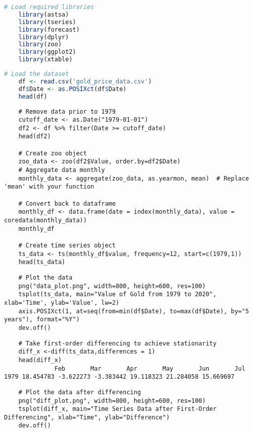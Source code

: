 \begin{lstlisting}[language=R]
    # Load required libraries
    library(astsa)
    library(tseries)
    library(forecast)
    library(dplyr)
    library(zoo)
    library(ggplot2)
    library(xtable)
\end{lstlisting}

\begin{lstlisting}[language=R]
    # Load the dataset
    df <- read.csv('gold_price_data.csv')
    df$Date <- as.POSIXct(df$Date)
    head(df)
\end{lstlisting}

\begin{lstlisting}
    # Remove data prior to 1979 
    cutoff_date <- as.Date("1979-01-01")
    df2 <- df %>% filter(Date >= cutoff_date)
    head(df2)
    
    # Create zoo object
    zoo_data <- zoo(df2$Value, order.by=df2$Date)
    # Aggregate data monthly
    monthly_data <- aggregate(zoo_data, as.yearmon, mean)  # Replace 'mean' with your function
    
    # Convert back to dataframe
    monthly_df <- data.frame(date = index(monthly_data), value = coredata(monthly_data))
    monthly_df

    # Create time series object
    ts_data <- ts(monthly_df$value, frequency=12, start=c(1979,1))
    head(ts_data)
\end{lstlisting}

\begin{lstlisting}
    # Plot the data
    png("data_plot.png", width=800, height=600, res=100)
    tsplot(ts_data, main="Value of Gold from 1979 to 2020", xlab='Time', ylab='Value', lw=2)
    axis.POSIXct(1, at=seq(from=min(df$Date), to=max(df$Date), by="5 years"), format="%Y")
    dev.off()
\end{lstlisting}

\begin{lstlisting}
    # Take first-order differencing to achieve stationarity
    diff_x <-diff(ts_data,differences = 1)
    head(diff_x)
              Feb       Mar       Apr       May       Jun       Jul
1979 18.454783 -3.622273 -3.383442 19.118323 21.284058 15.669697
\end{lstlisting}

\begin{lstlisting}
    # Plot the data after differencing
    png("diff_plot.png", width=800, height=600, res=100)
    tsplot(diff_x, main="Time Series Data after First-Order Differencing", xlab="Time", ylab="Difference")
    dev.off()
\end{lstlisting}

